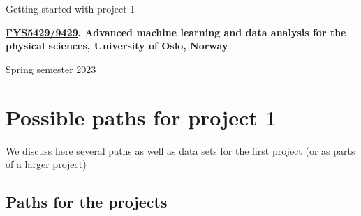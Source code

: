 \documentclass[%
oneside,                 %
final,                   %
10pt]{article}
\begin{document}

\newcommand{\exercisesection}[1]{\subsection*{#1}}






\thispagestyle{empty}

\begin{center}
{\LARGE\bf
\begin{spacing}{1.25}
Getting started with project 1 
\end{spacing}
}
\end{center}


\begin{center}
{\bf \href{{https://www.uio.no/studier/emner/matnat/fys/FYS5429/index-eng.html}}{FYS5429/9429}, Advanced machine learning and data analysis for the physical sciences, University of Oslo, Norway${}^{}$} \\ [0mm]
\end{center}

\begin{center}
\end{center}
    

\begin{center}
Spring semester 2023
\end{center}

\vspace{1cm}


\section{Possible paths for project 1}

We discuss here several paths as well as data sets for the first project (or as parts of a larger project)

\subsection{Paths for the projects}
\end{document}
